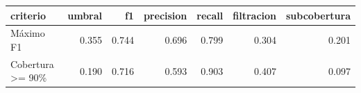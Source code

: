 
\begin{tabular}{lrrrrrr}
\toprule
criterio & umbral & f1 & precision & recall & filtracion & subcobertura\\
\midrule
Máximo F1 & 0.355 & 0.744 & 0.696 & 0.799 & 0.304 & 0.201\\
Cobertura >= 90\% & 0.190 & 0.716 & 0.593 & 0.903 & 0.407 & 0.097\\
\bottomrule
\end{tabular}
